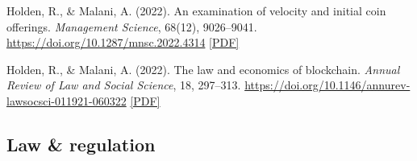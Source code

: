     \begin{tablist}

        \item[2022] \tab{}Holden, R., \& Malani, A. (2022). An examination of velocity and initial coin offerings. \textit{Management Science}, 68(12), 9026–9041. \href{https://doi.org/10.1287/mnsc.2022.4314}{https://doi.org/10.1287/mnsc.2022.4314} \href{https://github.com/anup-malani/website_personal/blob/main/publications/2022_HoldenMalani_ManagementScience_VelocityICO.pdf}{[PDF]}
        
        \item[2022] \tab{}Holden, R., \& Malani, A. (2022). The law and economics of blockchain. \textit{Annual Review of Law and Social Science}, 18, 297–313. \href{https://doi.org/10.1146/annurev-lawsocsci-011921-060322}{https://doi.org/10.1146/annurev-lawsocsci-011921-060322} \href{https://github.com/anup-malani/website_personal/blob/main/publications/2022_HoldenMalani_AnnualReview_LawEconomicsBlockchain.pdf}{[PDF]}
                
    \end{tablist}

    \subsection*{Law \& regulation}
    
